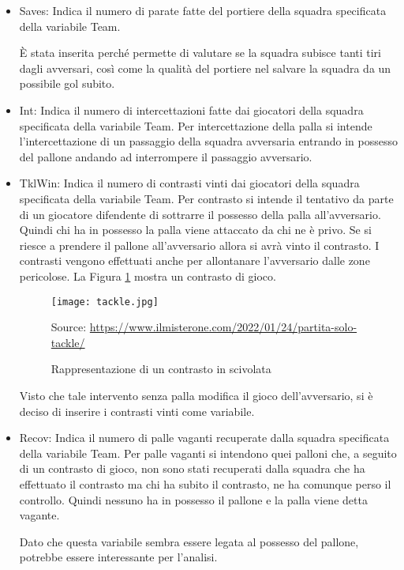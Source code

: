 \begin{itemize}
	
	\item \textsf{Saves}: Indica il numero di parate fatte del portiere della squadra specificata della variabile \textsf{Team}. 
	
	È stata inserita perché permette di valutare se la squadra subisce tanti tiri dagli avversari, così come la qualità del portiere nel salvare la squadra da un possibile gol subito.
	
	\item \textsf{Int}: Indica il numero di intercettazioni fatte dai giocatori della squadra specificata della variabile \textsf{Team}. Per intercettazione della palla si intende l'intercettazione di un passaggio della squadra avversaria entrando in possesso del pallone andando ad interrompere il passaggio avversario. 
	
	\item \textsf{TklWin}: Indica il numero di contrasti vinti dai giocatori della squadra specificata della variabile \textsf{Team}. Per contrasto si intende il tentativo da parte di un giocatore difendente di sottrarre il possesso della palla all'avversario. Quindi chi ha in possesso la palla viene attaccato da chi ne è privo. Se si riesce a prendere il pallone all'avversario allora si avrà vinto il contrasto. I contrasti vengono effettuati anche per allontanare l'avversario dalle zone pericolose. La Figura \ref{fig:tackle} mostra un contrasto di gioco.
	
	\begin{figure}[!ht]
		\begin{center}
			\texttt{[image: tackle.jpg]}
			\caption{Rappresentazione di un contrasto in scivolata}
			Source: \url{https://www.ilmisterone.com/2022/01/24/partita-solo-tackle/}
			\label{fig:tackle}
		\end{center}
	\end{figure}
	
	Visto che tale intervento senza palla modifica il gioco dell'avversario, si è deciso di inserire i contrasti vinti come variabile. 
	
	\item \textsf{Recov}: Indica il numero di palle vaganti recuperate dalla squadra specificata della variabile \textsf{Team}. Per palle vaganti si intendono quei palloni che, a seguito di un contrasto di gioco, non sono stati recuperati dalla squadra che ha effettuato il contrasto ma chi ha subito il contrasto, ne ha comunque perso il controllo. Quindi nessuno ha in possesso il pallone e la palla viene detta vagante.
	
	Dato che questa variabile sembra essere legata al possesso del pallone, potrebbe essere interessante per l'analisi.
	
	
\end{itemize}

